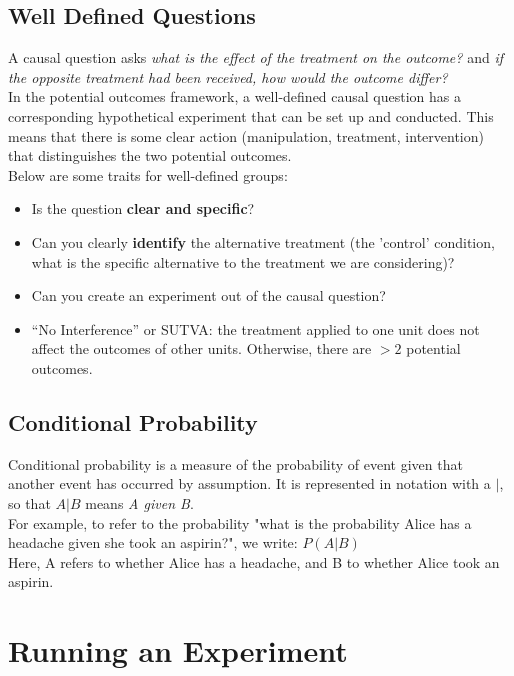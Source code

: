 \documentclass{article}
\begin{document}
\subsection{Well Defined Questions}
A causal question asks \textit{what is the effect of the treatment on the outcome?} and \textit{if the opposite treatment had been received, how would the outcome differ?} \\
In the potential outcomes framework, a well-defined causal question has a corresponding hypothetical experiment that can be set up and conducted.
This means that there is some clear action (manipulation, treatment, intervention) that distinguishes the two potential outcomes.
\\
Below are some traits for well-defined groups:
\begin{itemize}
    \item Is the question \textbf{clear and specific}?
    \item Can you clearly \textbf{identify} the alternative treatment (the 'control' condition, what is the specific alternative to the treatment we are considering)?
    \item Can you create an experiment out of the causal question?
    \item “No Interference” or SUTVA: the treatment applied to one unit does not affect the outcomes of other units. Otherwise, there are $>2$ potential outcomes.
\end{itemize}

\subsection{Conditional Probability}
Conditional probability is a measure of the probability of event given that another event has occurred by assumption. It is represented in notation with a $|$, so that $A|B$ means \textit{A given B}.
\\
For example, to refer to the probability "what is the probability Alice has a headache given she took an aspirin?", we write: $P(A|B)$ \\
Here, A refers to whether Alice has a headache, and B to whether Alice took an aspirin.


\section{Running an Experiment}
\end{document}
